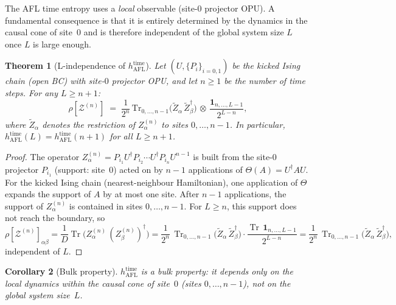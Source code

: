 \documentclass[12pt,a4paper]{article}
\newtheorem{theorem}{Theorem}[section]
\newtheorem{corollary}[theorem]{Corollary}
\DeclareMathOperator{\Tr}{Tr}
\begin{document}
The AFL time entropy uses a \emph{local} observable (site-0 projector OPU).
A fundamental consequence is that it is entirely determined by the dynamics
in the causal cone of site~$0$ and is therefore independent of the global
system size $L$ once $L$ is large enough.

\begin{theorem}[L-independence of $h_{\mathrm{AFL}}^{\mathrm{time}}$]
  \label{thm:l_independence}
  Let $(U, \{P_i\}_{i=0,1})$ be the kicked Ising chain (open BC)
  with site-$0$ projector OPU, and let $n \geq 1$ be the number of
  time steps.  For any $L \geq n+1$:
  \[
    \rho\!\left[\mathcal{Z}^{(n)}\right]
    \;=\;
    \frac{1}{2^n}\,
    \mathrm{Tr}_{0,\ldots,n-1}\!
    \bigl(\widetilde{Z}_\alpha\,\widetilde{Z}_\beta^\dagger\bigr)\,
    \otimes\,
    \frac{\mathbf{1}_{n,\ldots,L-1}}{2^{L-n}},
  \]
  where $\widetilde{Z}_\alpha$ denotes the restriction of
  $Z^{(n)}_\alpha$ to sites $0,\ldots,n-1$.
  In particular, $h_{\mathrm{AFL}}^{\mathrm{time}}(L)
  = h_{\mathrm{AFL}}^{\mathrm{time}}(n+1)$ for all $L \geq n+1$.
\end{theorem}

\begin{proof}
  The operator $Z^{(n)}_\alpha = P_{i_1}U^\dagger P_{i_2}\cdots
  U^\dagger P_{i_n}U^{n-1}$ is built from the site-0 projector $P_{i_1}$
  (support: site~$0$) acted on by $n-1$ applications of $\Theta(A)=U^\dagger
  A U$.  For the kicked Ising chain (nearest-neighbour Hamiltonian), one
  application of $\Theta$ expands the support of $A$ by at most one site.
  After $n-1$ applications, the support of $Z^{(n)}_\alpha$ is contained
  in sites $0,\ldots,n-1$.  For $L \geq n$, this support does not reach
  the boundary, so
  \[
    \rho\!\left[\mathcal{Z}^{(n)}\right]_{\alpha\beta}
    =\frac{1}{D}\Tr\!\bigl(Z^{(n)}_\alpha\,(Z^{(n)}_\beta)^\dagger\bigr)
    =\frac{1}{2^n}\,
    \Tr_{0,\ldots,n-1}\!\bigl(\widetilde{Z}_\alpha\,\widetilde{Z}_\beta^\dagger\bigr)
    \cdot \frac{\Tr\,\mathbf{1}_{n,\ldots,L-1}}{2^{L-n}}
    =\frac{1}{2^n}\,
    \Tr_{0,\ldots,n-1}\!\bigl(\widetilde{Z}_\alpha\,\widetilde{Z}_\beta^\dagger\bigr),
  \]
  independent of $L$.
\end{proof}

\begin{corollary}[Bulk property]
  \label{cor:bulk_property}
  $h_{\mathrm{AFL}}^{\mathrm{time}}$ is a \emph{bulk property}: it depends
  only on the local dynamics within the causal cone of site~$0$ (sites
  $0,\ldots,n-1$), not on the global system size~$L$.
\end{corollary}
\end{document}
